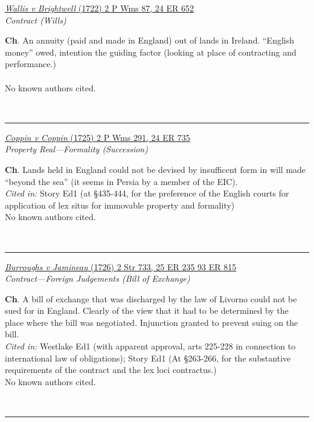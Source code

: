 \documentclass[twoside]{article}
\begin{document}
        \begin{small}
        \begin{center}
        \href{https://heinonline.org/HOL/P?h=hein.engrep/engrc0024&i=660}{\textit{Wallis v Brightwell} (1722) 2 P Wms 87, 24 ER 652} \label{23} \\ 
\textit{Contract (Wills)}\\
        \end{center}
        \textbf{Ch}. An annuity (paid and made in England) out of lands in Ireland. “English money” owed, intention the guiding factor (looking at place of contracting and performance.)\\\\No known authors cited.
        \end{small}\\
        \rule{\textwidth}{0.5pt}
        

        \begin{small}
        \begin{center}
        \href{https://heinonline.org/HOL/P?h=hein.engrep/engrc0024&i=743}{\textit{Coppin v Coppin} (1725) 2 P Wms 291, 24 ER 735} \label{135} \\ 
\textit{Property Real---Formality (Succession)}\\
        \end{center}
        \textbf{Ch}. Lands held in England could not be devised by insufficent form in will made “beyond the sea” (it seems in Persia by a member of the EIC).\\\textit{Cited in: }Story Ed1 (at §435-444, for the preference of the English courts for application of lex situs for immovable property and formality)\\No known authors cited.
        \end{small}\\
        \rule{\textwidth}{0.5pt}
        

        \begin{small}
        \begin{center}
        \href{https://heinonline.org/HOL/P?h=hein.engrep/engrc0025&i=243, https://heinonline.org/HOL/P?h=hein.engrep/engrf0093&i=819}{\textit{Burroughs v Jamineau} (1726) 2 Str 733, 25 ER 235 93 ER 815} \label{10} \\ 
\textit{Contract---Foreign Judgements (Bill of Exchange)}\\
        \end{center}
        \textbf{Ch}. A bill of exchange that was discharged by the law of Livorno could not be sued for in England. Clearly of the view that it had to be determined by the place where the bill was negotiated. Injunction granted to prevent suing on the bill.\\\textit{Cited in: }Westlake Ed1 (with apparent approval, arts 225-228 in connection to international law of obligations); Story Ed1 (At §263-266, for the substantive requirements of the contract and the lex loci contractus.)\\No known authors cited.
        \end{small}\\
        \rule{\textwidth}{0.5pt}
        
\end{document}
